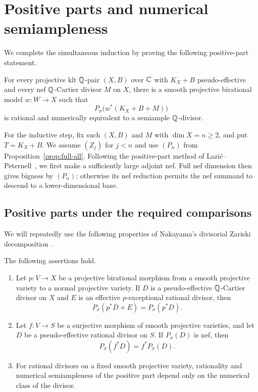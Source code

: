 \section{Positive parts and numerical semiampleness}
\label{sec:positive}

We complete the simultaneous induction by proving the following
positive-part statement.

\begin{proposition}\label{prop:positive-part}
For every projective klt $\mathbb Q$-pair $(X,B)$ over $\mathbb C$ with
$K_X+B$ pseudo-effective and every nef $\mathbb Q$-Cartier divisor $M$ on
$X$, there is a smooth projective birational model $w\colon W\to X$
such that
\[
                     P_\sigma\bigl(w^*(K_X+B+M)\bigr)
\]
is rational and numerically equivalent to a semiample $\mathbb Q$-divisor.
\end{proposition}

For the inductive step, fix such $(X,B)$ and $M$ with $\dim X=n\geq2$,
and put $T=K_X+B$.  We assume $(Z_j)$ for $j<n$ and use $(P_n)$
from Proposition~\ref{prop:full-all}.  Following the positive-part
method of Lazi\'c--Peternell~\cite[Theorem 5.3]{LP}, we first make
a sufficiently large adjoint nef.  Full nef dimension then gives
bigness by $(P_n)$; otherwise its nef reduction permits the nef
summand to descend to a lower-dimensional base.

\subsection{Positive parts under the required comparisons}

We will repeatedly use the following properties of Nakayama's
divisorial Zariski decomposition \cite{Nakayama}.

\begin{lemma}\label{lemma:positive-properties}
The following assertions hold.
\begin{enumerate}
\item Let $p\colon V\to X$ be a projective birational morphism from
a smooth projective variety to a normal projective variety.  If $D$
is a pseudo-effective $\mathbb Q$-Cartier divisor on $X$ and $E$ is an
effective $p$-exceptional rational divisor, then
\[
                       P_\sigma(p^*D+E)=P_\sigma(p^*D).
\]
\item Let $f\colon V\to S$ be a surjective morphism of smooth
projective varieties, and let $D$ be a pseudo-effective rational
divisor on $S$.  If $P_\sigma(D)$ is nef, then
\[
                         P_\sigma(f^*D)=f^*P_\sigma(D).
\]
\item For rational divisors on a fixed smooth projective variety,
rationality and numerical semiampleness of the positive part depend
only on the numerical class of the divisor.
\end{enumerate}
\end{lemma}

